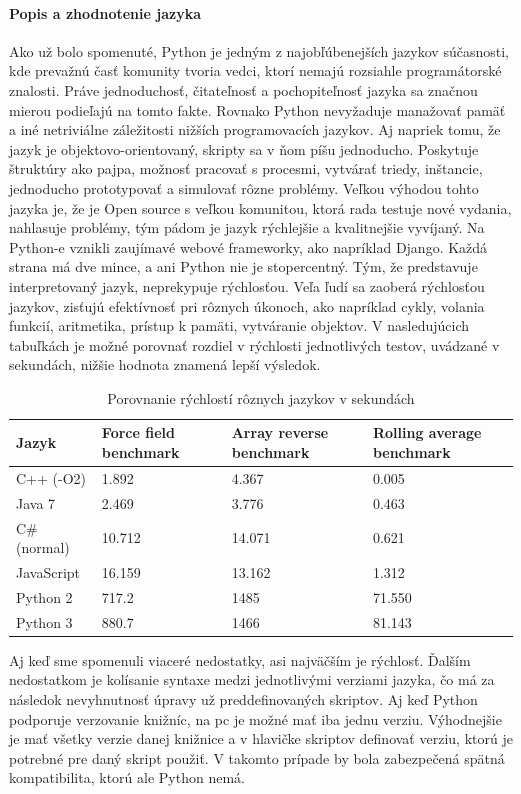 \paragraph{Popis a zhodnotenie jazyka}
\indent Ako už bolo spomenuté, Python je jedným z najobľúbenejších jazykov súčasnosti, kde prevažnú časť komunity tvoria vedci, ktorí nemajú rozsiahle programátorské znalosti. Práve jednoduchosť, čitateľnosť a pochopiteľnosť jazyka sa značnou mierou podieľajú na tomto fakte. Rovnako Python nevyžaduje manažovať pamäť a iné netriviálne záležitosti nižších programovacích jazykov. Aj napriek tomu, že jazyk je objektovo-orientovaný, skripty sa v ňom píšu jednoducho. Poskytuje štruktúry ako pajpa, možnosť pracovať s procesmi, vytvárať triedy, inštancie, jednoducho prototypovať a simulovať rôzne problémy. Veľkou výhodou tohto jazyka je, že je Open source s veľkou komunitou, ktorá rada testuje nové vydania, nahlasuje problémy, tým pádom je jazyk rýchlejšie a kvalitnejšie vyvíjaný. Na Python-e vznikli zaujímavé webové frameworky, ako napríklad Django. Každá strana má dve mince, a ani Python nie je stopercentný. Tým, že predstavuje interpretovaný jazyk, neprekypuje rýchlosťou. Veľa ľudí sa zaoberá rýchlosťou jazykov, zisťujú efektívnosť pri rôznych úkonoch, ako napríklad cykly, volania funkcií, aritmetika, prístup k pamäti, vytváranie objektov. V nasledujúcich tabuľkách je možné porovnať rozdiel v rýchlosti jednotlivých testov, uvádzané v sekundách, nižšie hodnota znamená lepší výsledok. 
\begin{center}
	\begin{table}[htbp]
		\begin{tabular}{|p{3.5cm}|p{3.5cm}|p{3.5cm}|p{3.5cm}|}
			\hline
			\textbf{Jazyk} & \textbf{Force field benchmark}  & \textbf{Array reverse benchmark}&\textbf{Rolling average benchmark} \\ 
			\hline
			C++ (-O2)&1.892&4.367&0.005\\
			\hline
			Java 7&2.469&3.776&0.463\\
			\hline
			C\# (normal)&10.712&14.071&0.621\\
			\hline
			JavaScript&16.159&13.162&1.312\\
			\hline
			Python 2&717.2&1485&71.550\\
			\hline
			Python 3&880.7&1466&81.143\\
			\hline
		\end{tabular}
		\caption{Porovnanie rýchlostí rôznych jazykov v sekundách\cite{gitspeed}}
		\label{table:1}
	\end{table}
\end{center}
Aj keď sme spomenuli viaceré nedostatky, asi najväčším je rýchlosť. Ďalším nedostatkom je kolísanie syntaxe medzi jednotlivými verziami jazyka, čo má za následok nevyhnutnosť úpravy už preddefinovaných skriptov. Aj keď Python podporuje verzovanie knižníc, na \acrshort{pc} je možné mať iba jednu verziu. Výhodnejšie je mať všetky verzie danej knižnice a v hlavičke skriptov definovať verziu, ktorú je potrebné pre daný skript použiť. V takomto prípade by bola zabezpečená spätná kompatibilita, ktorú ale Python nemá.
